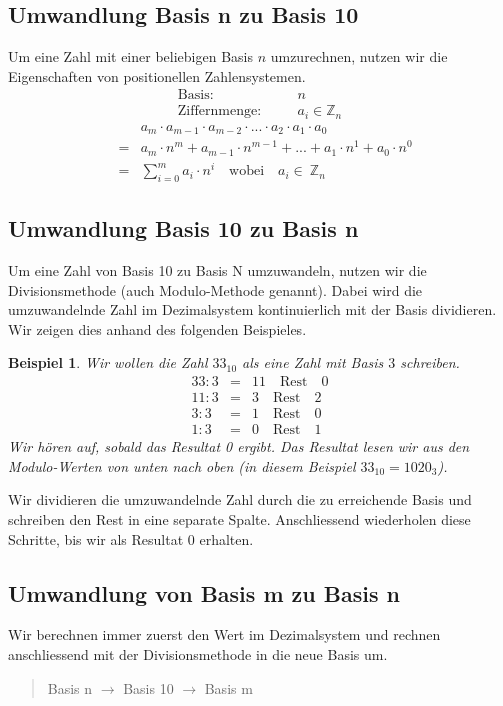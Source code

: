 \documentclass{report}
\newtheorem{myexample}{Beispiel}
\begin{document}
\subsection{Umwandlung Basis n zu Basis 10}
Um eine Zahl mit einer beliebigen Basis $n$ umzurechnen, nutzen wir die Eigenschaften von positionellen Zahlensystemen.
\begin{eqnarray}\mbox{Basis}:&\quad& n \nonumber \\
\mbox{Ziffernmenge}:&\quad&a_i \in \mathbb{Z}_n\end{eqnarray}
\begin{eqnarray}&&a_m \cdot a_{m-1} \cdot a_{m-2} \cdot ... \cdot a_2 \cdot a_1 \cdot a_0 \nonumber \\
&=&a_m \cdot n^m + a_{m-1} \cdot n^{m-1} + ... + a_1 \cdot n^1 + a_0 \cdot n^0 \nonumber \\
&=&\sum_{i=0}^{m} a_i \cdot n^i \quad \mbox{wobei}\quad a_i \in\ \mathbb{Z}_n\end{eqnarray}
\subsection{Umwandlung Basis 10 zu Basis n}
Um eine Zahl von Basis 10 zu Basis N umzuwandeln, nutzen wir die Divisionsmethode (auch Modulo-Methode genannt). Dabei wird die umzuwandelnde Zahl im Dezimalsystem kontinuierlich mit der Basis dividieren. Wir zeigen dies anhand des folgenden Beispieles.
\begin{myexample}Wir wollen die Zahl $33_{10}$ als eine Zahl mit Basis $3$ schreiben.
\begin{eqnarray}
33 : 3 &=& 11 \quad \mbox{Rest} \quad 0 \nonumber \\
11 : 3 &=& 3 \quad \mbox{Rest} \quad 2 \nonumber \\
3 : 3 &=& 1 \quad \mbox{Rest} \quad 0 \nonumber \\
1 : 3 &=& 0 \quad \mbox{Rest} \quad 1\end{eqnarray}
Wir hören auf, sobald das Resultat 0 ergibt. Das Resultat lesen wir aus den Modulo-Werten von unten nach oben (in diesem Beispiel $33_{10} = 1020_3$).
\end{myexample}Wir dividieren die umzuwandelnde Zahl durch die zu erreichende Basis und schreiben den Rest in eine separate Spalte. Anschliessend wiederholen diese Schritte, bis wir als Resultat 0 erhalten.
\subsection{Umwandlung von Basis m zu Basis n}
Wir berechnen immer zuerst den Wert im Dezimalsystem und rechnen anschliessend mit der Divisionsmethode in die neue Basis um.
\begin{quote}Basis n $\to$ Basis 10 $\to$ Basis m\end{quote}
\newpage
\end{document}
